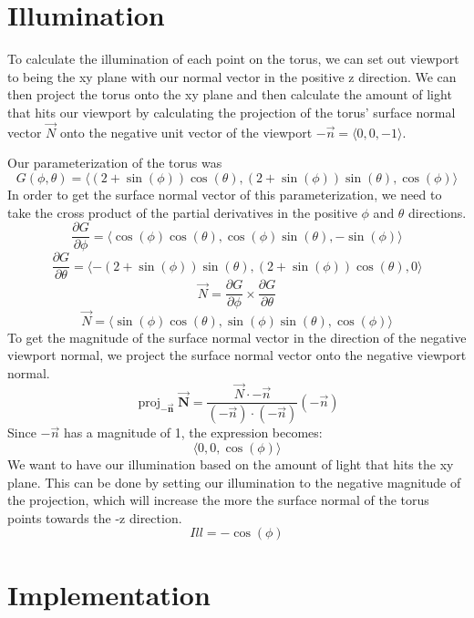 \documentclass{article}
\DeclareMathOperator{\proj}{proj}
\newcommand{\vct}{\mathbf}
\newcommand{\vctproj}[2][]{\proj_{\vct{#1}}\vct{#2}}
\begin{document}
\section{Illumination}
\begin{flushleft}
To calculate the illumination of each point on the torus, we can set out viewport to being the xy plane with our normal vector in the positive z direction. We can then project the torus onto the xy plane and then calculate the amount of light that hits our viewport by calculating the projection of the torus' surface normal vector $\vec{N}$ onto the negative unit vector of the viewport $-\vec{n} = \langle 0,0,-1 \rangle$.
\end{flushleft}

\begin{flushleft}
Our parameterization of the torus was $$G(\phi,\theta) = \langle (2+\sin(\phi))\cos(\theta),(2+\sin(\phi))\sin(\theta),\cos(\phi) \rangle$$
In order to get the surface normal vector of this parameterization, we need to take the cross product of the partial derivatives in the positive $\phi$ and $\theta$ directions.
$$\frac{\partial G}{\partial \phi} = \langle \cos(\phi)\cos(\theta), \cos(\phi)\sin(\theta),- \sin(\phi)\rangle$$
$$\frac{\partial G}{\partial \theta} = \langle-(2+\sin(\phi))\sin(\theta),(2+\sin(\phi))\cos(\theta),0\rangle$$
$$\vec{N} = \frac{\partial G}{\partial \phi} \times \frac{\partial G}{\partial \theta}$$
$$\vec{N} = \langle \sin(\phi)\cos(\theta),\sin(\phi)\sin(\theta),\cos(\phi) \rangle$$
To get the magnitude of the surface normal vector in the direction of the negative viewport normal, we project the surface normal vector onto the negative viewport normal.
$$\vctproj[-\vec{n}]{\vec{N}} = \frac{\vec{N} \cdot -\vec{n}}{(-\vec{n})\cdot(-\vec{n})}(-\vec{n})$$
Since $-\vec{n}$ has a magnitude of 1, the expression becomes:
$$\langle 0,0,\cos(\phi) \rangle$$
We want to have our illumination based on the amount of light that hits the xy plane. This can be done by setting our illumination to the negative magnitude of the projection, which will increase the more the surface normal of the torus points towards the -z direction.
$$Ill = -\cos(\phi)$$
\end{flushleft}

\section{Implementation}
\end{document}
